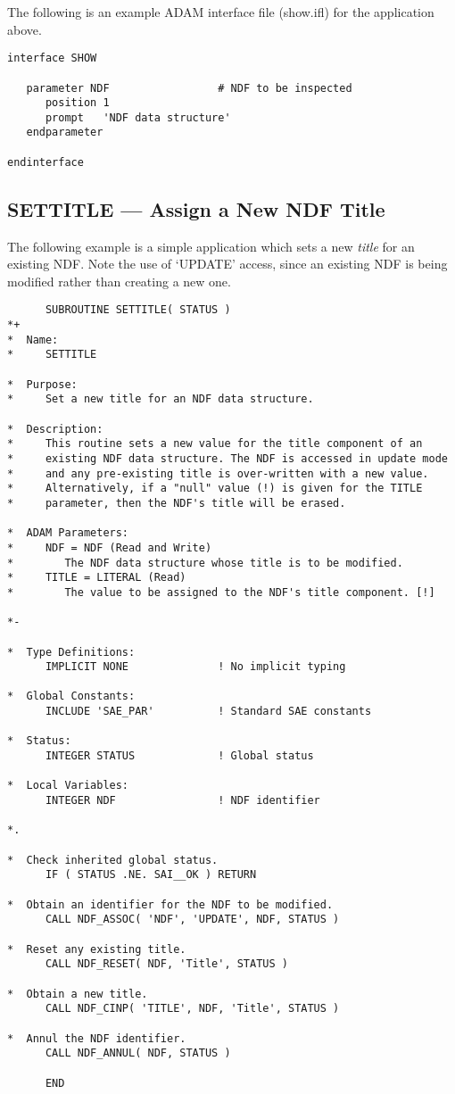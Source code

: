 \documentclass[twoside,11pt]{article}
\newcommand{\xlabel}[1]{}
\newcommand{\st}[1]{{\em{#1}}}
\begin{document}
The following is an example ADAM interface file (show.ifl) for the application
above. 

\small
\begin{verbatim}
interface SHOW

   parameter NDF                 # NDF to be inspected
      position 1
      prompt   'NDF data structure'
   endparameter

endinterface
\end{verbatim}
\normalsize

\newpage
\subsection{\xlabel{SETTITLE}\label{ss:titleexample}SETTITLE --- Assign a New NDF Title}

The following example is a simple application which sets a new
\st{title\/} for an existing NDF. Note the use of `UPDATE' access,
since an 
existing NDF is being modified rather than creating a new one.

\small
\begin{verbatim}
      SUBROUTINE SETTITLE( STATUS )
*+
*  Name:
*     SETTITLE

*  Purpose:
*     Set a new title for an NDF data structure.

*  Description:
*     This routine sets a new value for the title component of an
*     existing NDF data structure. The NDF is accessed in update mode
*     and any pre-existing title is over-written with a new value.
*     Alternatively, if a "null" value (!) is given for the TITLE
*     parameter, then the NDF's title will be erased.

*  ADAM Parameters:
*     NDF = NDF (Read and Write)
*        The NDF data structure whose title is to be modified.
*     TITLE = LITERAL (Read)
*        The value to be assigned to the NDF's title component. [!]

*-
      
*  Type Definitions:
      IMPLICIT NONE              ! No implicit typing

*  Global Constants:
      INCLUDE 'SAE_PAR'          ! Standard SAE constants

*  Status:
      INTEGER STATUS             ! Global status

*  Local Variables:
      INTEGER NDF                ! NDF identifier

*.

*  Check inherited global status.
      IF ( STATUS .NE. SAI__OK ) RETURN

*  Obtain an identifier for the NDF to be modified.
      CALL NDF_ASSOC( 'NDF', 'UPDATE', NDF, STATUS )

*  Reset any existing title.
      CALL NDF_RESET( NDF, 'Title', STATUS )

*  Obtain a new title.
      CALL NDF_CINP( 'TITLE', NDF, 'Title', STATUS )

*  Annul the NDF identifier.
      CALL NDF_ANNUL( NDF, STATUS )

      END
\end{verbatim}
\normalsize
\end{document}
